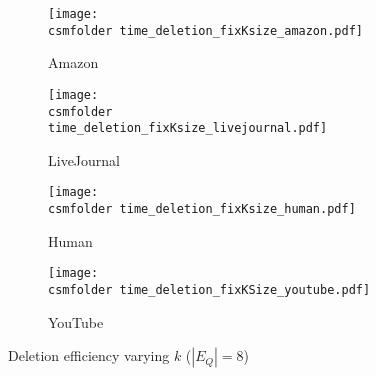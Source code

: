 \begin{figure}[h!]
\def\wscorevone{0.35}
\centering
    \begin{subfigure}[t]{\wscorevone\linewidth}
	    \centering
	    \resizebox{\linewidth}{!}
	    {
	        \texttt{[image: \\csmfolder time\_deletion\_fixKsize\_amazon.pdf]}
	    }
	    \caption{Amazon}
	    \label{fig:time:deletion:fixKsize:amazon}
    \end{subfigure}
    \begin{subfigure}[t]{\wscorevone\linewidth}
        \centering
        \resizebox{\linewidth}{!}
        {
            \texttt{[image: \\csmfolder  time\_deletion\_fixKsize\_livejournal.pdf]}
        }
        \caption{LiveJournal}
        \label{fig:time:deletion:fixKsize:livejournal}
    \end{subfigure}
     \begin{subfigure}[t]{\wscorevone\linewidth}
         \centering
         \resizebox{\linewidth}{!}
         {
             \texttt{[image: \\csmfolder  time\_deletion\_fixKsize\_human.pdf]}
         }
         \caption{Human}
         \label{fig:time:deletion:fixKsize:human}
     \end{subfigure}
     \begin{subfigure}[t]{\wscorevone\linewidth}
         \centering
         \resizebox{\linewidth}{!}
         {
             \texttt{[image: \\csmfolder time\_deletion\_fixKSize\_youtube.pdf]}
         }
         \caption{YouTube}
         \label{fig:time:deletion:fixKsize:youtube}
     \end{subfigure}
\caption{Deletion efficiency varying $k$ ($|E_Q|=8$)}
\label{fig:time:deletion:fixKsize}
\end{figure}